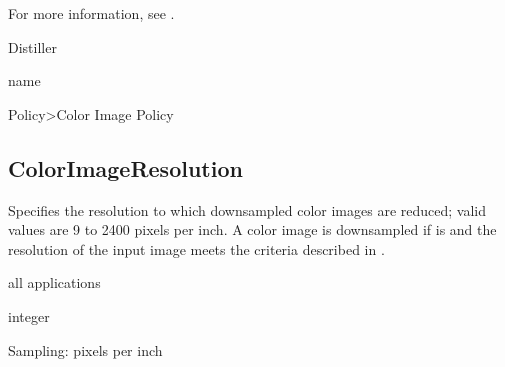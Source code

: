 \documentclass[letterpaper,12pt,english,openany,oneside]{sphinxmanual}
\begin{document}
For more information, see .

\label{\detokenize{PDF_Create_CommonSettings:supported-by-28}}

Distiller

\label{\detokenize{PDF_Create_CommonSettings:type-28}}

name

\label{\detokenize{PDF_Create_CommonSettings:ui-name-21}}

Policy\sphinxhyphen{}>Color Image Policy

\label{\detokenize{PDF_Create_CommonSettings:default-value-25}}

\begin{sphinxVerbatim}[commandchars=\\\{\}]
\end{sphinxVerbatim}




\subsection{ColorImageResolution}
\label{\detokenize{PDF_Create_CommonSettings:colorimageresolution}}
Specifies the resolution to which downsampled color images are reduced; valid values are 9 to 2400 pixels per inch. A color image is downsampled if  is  and the resolution of the input image meets the criteria described in .

\label{\detokenize{PDF_Create_CommonSettings:supported-by-29}}

all applications

\label{\detokenize{PDF_Create_CommonSettings:type-29}}

integer

\label{\detokenize{PDF_Create_CommonSettings:ui-name-22}}

Sampling: pixels per inch

\label{\detokenize{PDF_Create_CommonSettings:default-value-26}}
\end{document}
